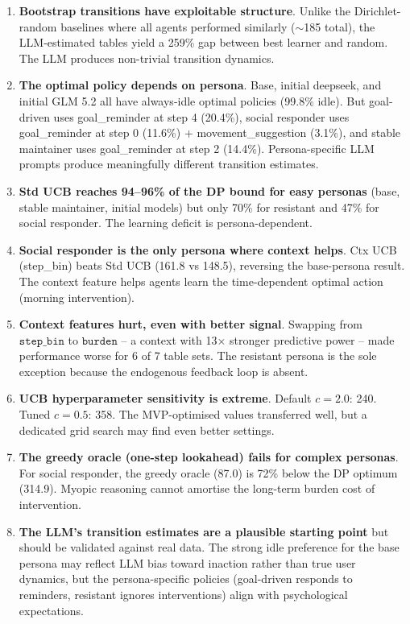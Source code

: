 \documentclass[11pt]{article}
\begin{document}
\begin{enumerate}
  \item \textbf{Bootstrap transitions have exploitable structure}. Unlike the Dirichlet-random baselines where all agents performed similarly ($\sim$185 total), the LLM-estimated tables yield a 259\% gap between best learner and random. The LLM produces non-trivial transition dynamics.
  \item \textbf{The optimal policy depends on persona}. Base, initial deepseek, and initial GLM 5.2 all have always-idle optimal policies (99.8\% idle). But goal-driven uses goal\_reminder at step 4 (20.4\%), social responder uses goal\_reminder at step 0 (11.6\%) + movement\_suggestion (3.1\%), and stable maintainer uses goal\_reminder at step 2 (14.4\%). Persona-specific LLM prompts produce meaningfully different transition estimates.
  \item \textbf{Std UCB reaches 94--96\% of the DP bound for easy personas} (base, stable maintainer, initial models) but only 70\% for resistant and 47\% for social responder. The learning deficit is persona-dependent.
  \item \textbf{Social responder is the only persona where context helps}. Ctx UCB (step\_bin) beats Std UCB (161.8 vs 148.5), reversing the base-persona result. The context feature helps agents learn the time-dependent optimal action (morning intervention).
  \item \textbf{Context features hurt, even with better signal}. Swapping from $\texttt{step\_bin}$ to $\texttt{burden}$ -- a context with 13$\times$ stronger predictive power -- made performance worse for 6 of 7 table sets. The resistant persona is the sole exception because the endogenous feedback loop is absent.
  \item \textbf{UCB hyperparameter sensitivity is extreme}. Default $c=2.0$: 240. Tuned $c=0.5$: 358. The MVP-optimised values transferred well, but a dedicated grid search may find even better settings.
  \item \textbf{The greedy oracle (one-step lookahead) fails for complex personas}. For social responder, the greedy oracle (87.0) is 72\% below the DP optimum (314.9). Myopic reasoning cannot amortise the long-term burden cost of intervention.
  \item \textbf{The LLM's transition estimates are a plausible starting point} but should be validated against real data. The strong idle preference for the base persona may reflect LLM bias toward inaction rather than true user dynamics, but the persona-specific policies (goal-driven responds to reminders, resistant ignores interventions) align with psychological expectations.
\end{enumerate}
\end{document}
